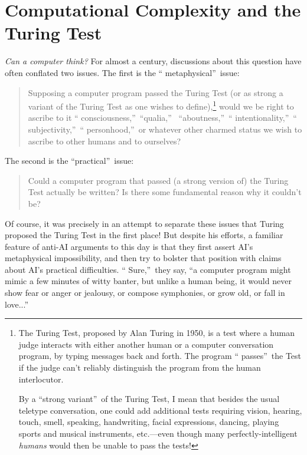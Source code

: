 \documentclass[12pt,onecolumn]{article}%
\begin{document}
\section{Computational Complexity and the Turing Test\label{AI}}

\textit{Can a computer think?} For almost a century, discussions about this
question have often conflated two issues. The first is the \textquotedblleft
metaphysical\textquotedblright\  issue:

\begin{quotation}
\noindent Supposing a computer program passed the Turing Test (or as strong a
variant of the Turing Test as one wishes to define),\footnote{The Turing Test,
proposed by Alan Turing \cite{turing:ai} in 1950, is a test where a human
judge interacts with either another human or a computer conversation program,
by typing messages back and forth. The program \textquotedblleft
passes\textquotedblright\  the Test if the judge can't reliably distinguish the
program from the human interlocutor.
\par
By a \textquotedblleft strong variant\textquotedblright\  of the Turing Test, I
mean that besides the usual teletype conversation, one could add additional
tests requiring vision, hearing, touch, smell, speaking, handwriting, facial
expressions, dancing, playing sports and musical instruments, etc.---even
though many perfectly-intelligent \textit{humans} would then be unable to pass
the tests!} would we be right to ascribe to it \textquotedblleft
consciousness,\textquotedblright\  \textquotedblleft qualia,\textquotedblright\ %
 \textquotedblleft aboutness,\textquotedblright\  \textquotedblleft
intentionality,\textquotedblright\  \textquotedblleft
subjectivity,\textquotedblright\  \textquotedblleft
personhood,\textquotedblright\  or whatever other charmed status we wish to
ascribe to other humans and to ourselves?
\end{quotation}

The second is the \textquotedblleft practical\textquotedblright\  issue:

\begin{quotation}
\noindent Could a computer program that passed (a strong version of) the
Turing Test actually be written? Is there some fundamental reason why it
couldn't be?
\end{quotation}

Of course, it was precisely in an attempt to separate these issues that Turing
proposed the Turing Test in the first place! But despite his efforts, a
familiar feature of anti-AI arguments to this day is that they first assert
AI's metaphysical impossibility, and then try to bolster that position with
claims about AI's practical difficulties. \textquotedblleft
Sure,\textquotedblright\  they say, \textquotedblleft a computer program might
mimic a few minutes of witty banter, but unlike a human being, it would never
show fear or anger or jealousy, or compose symphonies, or grow old, or fall in
love...\textquotedblright\ 
\end{document}
